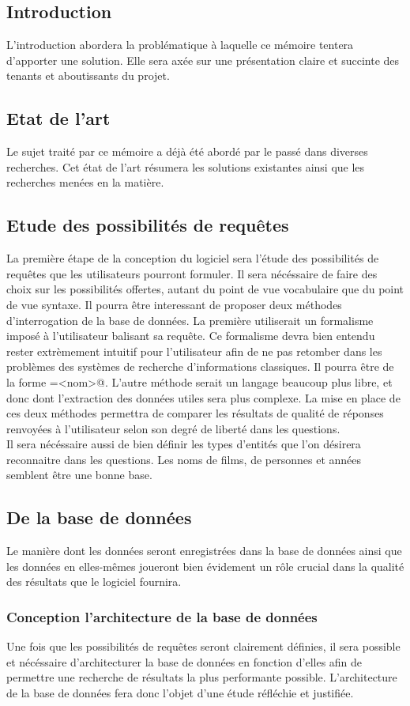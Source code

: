 \documentclass[11pt]{article}
\begin{document}
\subsection{Introduction}
L'introduction abordera la problématique à laquelle ce mémoire tentera d'apporter une solution.
Elle sera axée sur une présentation claire et succinte des tenants et aboutissants du projet.
\subsection{Etat de l'art}
Le sujet traité par ce mémoire a déjà été abordé par le passé dans diverses recherches.
Cet état de l'art résumera les solutions existantes ainsi que les recherches menées en la matière.
\subsection{Etude des possibilités de requêtes}
La première étape de la conception du logiciel sera l'étude des possibilités de requêtes que les utilisateurs pourront formuler.
Il sera nécéssaire de faire des choix sur les possibilités offertes, autant du point de vue vocabulaire que du point de vue syntaxe.
Il pourra être interessant de proposer deux méthodes d'interrogation de la base de données.
La première utiliserait un formalisme imposé à l'utilisateur balisant sa requête.
Ce formalisme devra bien entendu rester extrèmement intuitif pour l'utilisateur afin de ne pas retomber dans les problèmes des systèmes de recherche d'informations classiques.
Il pourra être de la forme \verb@actor=<nom>@. 
L'autre méthode serait un langage beaucoup plus libre, et donc dont l'extraction des données utiles sera plus complexe. 
La mise en place de ces deux méthodes permettra de comparer les résultats de qualité de réponses renvoyées à l'utilisateur selon son degré de liberté dans les questions. \\

Il sera nécéssaire aussi de bien définir les types d'entités que l'on désirera reconnaitre dans les questions.
Les noms de films, de personnes et années semblent être une bonne base. 
\subsection{De la base de données}
Le manière dont les données seront enregistrées dans la base de données ainsi que les données en elles-mêmes joueront bien évidement un rôle crucial dans la qualité des résultats que le logiciel fournira.
\subsubsection{Conception l'architecture de la base de données}
Une fois que les possibilités de requêtes seront clairement définies, il sera possible et nécéssaire d'architecturer la base de données en fonction d'elles afin de permettre une recherche de résultats la plus performante possible.
L'architecture de la base de données fera donc l'objet d'une étude réfléchie et justifiée.
\end{document}

